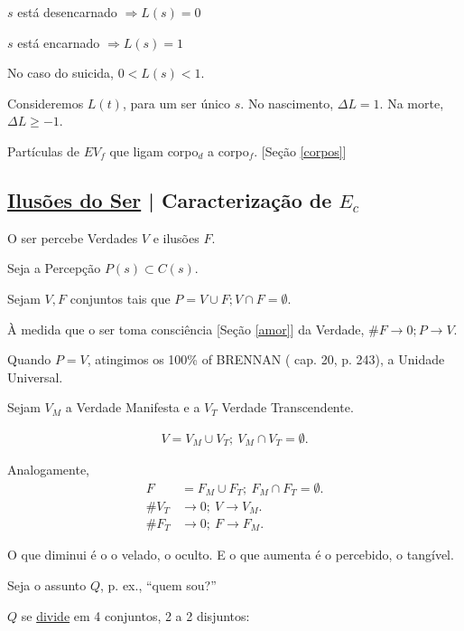 \documentclass[12pt,a4paper]{article}
\begin{document}
			$s$ est\'a desencarnado $\Rightarrow L(s) = 0$

			$s$ est\'a encarnado $\Rightarrow L(s) = 1$

			No caso do suicida, $0 < L(s) < 1$.

			Consideremos $L(t)$, para um ser \'unico $s$. No nascimento, $\Delta L = 1$. Na morte, $\Delta L \ge -1$.

			Part\'iculas de $EV_f$ que ligam corpo$_d$ a corpo$_f$. [Se\c{c}\~ao \ref{corpos}]

		\subsection{\underline{Ilus\~oes do Ser} | Caracteriza\c{c}\~ao de $ E_c $}\label{caracEc}
			\begin{flushright}
			\end{flushright}

			O ser percebe Verdades $V$ e ilus\~oes $F$.

			Seja a Percep\c{c}\~ao $ P(s) \subset C(s) $.

			Sejam $V, F$ conjuntos tais que $ P = V \cup F; V \cap F = \emptyset $.

			\`A medida que o ser toma consci\^encia [Se\c{c}\~ao \ref{amor}] da Verdade, $ \#F \rightarrow 0; P \rightarrow V $.

			Quando $P = V$, atingimos os 100\% of BRENNAN (\cite{brennan} cap. 20, p. 243), a Unidade Universal\cite{unidade}.

			Sejam $V_M$ a Verdade Manifesta e a $V_T$ Verdade Transcendente.

			\begin{align*}
				V = V_M \cup V_T; \
				V_M \cap V_T = \emptyset.
			\end{align*}

			Analogamente,
			\begin{align*}
				F &= F_M \cup F_T; \
				F_M \cap F_T = \emptyset. \\
				\#V_T &\rightarrow 0; \
				V \rightarrow V_M. \\
				\#F_T &\rightarrow 0; \
				F \rightarrow F_M.
			\end{align*}

			O que diminui \'e o o velado, o oculto. E o que aumenta \'e o percebido, o tang\'ivel.

			Seja o assunto $Q$, p. ex., \textquotedblleft quem sou?\textquotedblright

			$Q$ se \href{http://en.wikipedia.org/wiki/Connected_space}{divide} em 4 conjuntos, 2 a 2 disjuntos:
\end{document}
